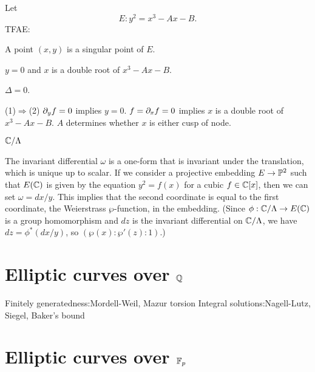 \documentclass{../../large}
\begin{document}
\begin{thm}
Let
\[E:y^2=x^3-Ax-B.\]
TFAE:
\begin{parts}
\item A point $(x,y)$ is a singular point of $E$.
\item $y=0$ and $x$ is a double root of $x^3-Ax-B$.
\item $\Delta=0$.
\end{parts}
\end{thm}
\begin{pf}
(1)$\Rightarrow$(2)
$\pd_yf=0$ implies $y=0$. $f=\pd_xf=0$ implies $x$ is a double root of $x^3-Ax-B$.
$A$ determines whether $x$ is either cusp of node.
\end{pf}





$\C/\Lambda$

\begin{prb}
The invariant differential $\omega$ is a one-form that is invariant under the translation, which is unique up to scalar.
If we consider a projective embedding $E\to\P^2$ such that $E(\C)$ is given by the equation $y^2=f(x)$ for a cubic $f\in\C[x]$, then we can set $\omega=dx/y$.
This implies that the second coordinate is equal to the first coordinate, the Weierstrass $\wp$-function, in the embedding. (Since $\phi:\C/\Lambda\to E(\C)$ is a group homomorphism and $dz$ is the invariant differential on $\C/\Lambda$, we have $dz=\phi^*(dx/y)$, so $(\wp(x):\wp'(z):1)$.)
\end{prb}










\section{Elliptic curves over $\Q$}
Finitely generatedness:Mordell-Weil, Mazur torsion
Integral solutions:Nagell-Lutz, Siegel, Baker's bound
\section{Elliptic curves over $\F_p$}
\end{document}
